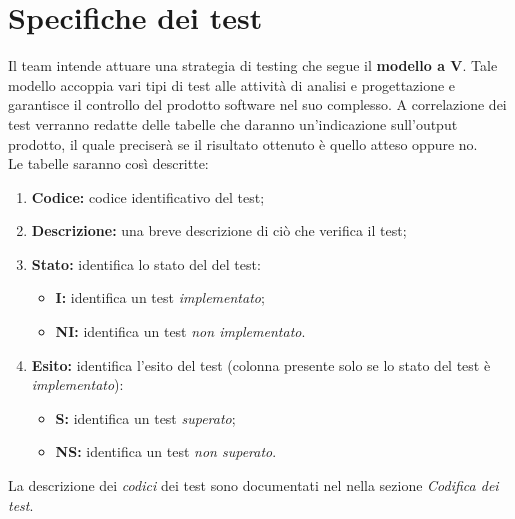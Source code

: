 \section{Specifiche dei test}
Il team intende attuare una strategia di testing che segue il \textbf{modello a V}. Tale modello accoppia vari tipi di test alle attività di analisi e progettazione e garantisce il controllo del prodotto software nel suo complesso. A correlazione dei test verranno redatte delle tabelle che daranno un'indicazione sull'output prodotto, il quale preciserà se il risultato ottenuto è quello atteso oppure no.\\
Le tabelle saranno così descritte:
\begin{enumerate}
	\item \textbf{Codice:} codice identificativo del test;
	\item \textbf{Descrizione:} una breve descrizione di ciò che verifica il test;
	\item \textbf{Stato:} identifica lo stato del del test:
	\begin{itemize}
		\item \textbf{I:} identifica un test \textit{implementato};
		\item \textbf{NI:} identifica un test \textit{non implementato}. 
	\end{itemize}
	\item \textbf{Esito:} identifica l'esito del test (colonna presente solo se lo stato del test è \textit{implementato}):
	\begin{itemize}
		\item \textbf{S:} identifica un test \textit{superato};
		\item \textbf{NS:} identifica un test \textit{non superato}. 
	\end{itemize}
\end{enumerate}
La descrizione dei \textit{codici} dei test sono documentati nel \NdPv nella sezione \textit{Codifica dei test}.

